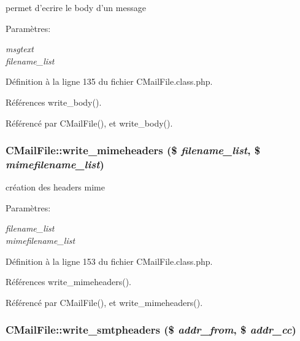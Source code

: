 permet d'ecrire le body d'un message 

\begin{Desc}
\item[Param\`{e}tres:]
\begin{description}
\item[{\em msgtext}]\item[{\em filename\_\-list}]\end{description}
\end{Desc}


D\'{e}finition \`{a} la ligne 135 du fichier CMail\-File.class.php.

R\'{e}f\'{e}rences write\_\-body().

R\'{e}f\'{e}renc\'{e} par CMail\-File(), et write\_\-body().\hypertarget{classCMailFile_a5}{
\subsubsection[write\_\-mimeheaders]{\setlength{\rightskip}{0pt plus 5cm}CMail\-File::write\_\-mimeheaders (\$ {\em filename\_\-list}, \$ {\em mimefilename\_\-list})}}
\label{classCMailFile_a5}


cr\'{e}ation des headers mime 

\begin{Desc}
\item[Param\`{e}tres:]
\begin{description}
\item[{\em filename\_\-list}]\item[{\em mimefilename\_\-list}]\end{description}
\end{Desc}


D\'{e}finition \`{a} la ligne 153 du fichier CMail\-File.class.php.

R\'{e}f\'{e}rences write\_\-mimeheaders().

R\'{e}f\'{e}renc\'{e} par CMail\-File(), et write\_\-mimeheaders().\hypertarget{classCMailFile_a6}{
\subsubsection[write\_\-smtpheaders]{\setlength{\rightskip}{0pt plus 5cm}CMail\-File::write\_\-smtpheaders (\$ {\em addr\_\-from}, \$ {\em addr\_\-cc})}}
\label{classCMailFile_a6}


